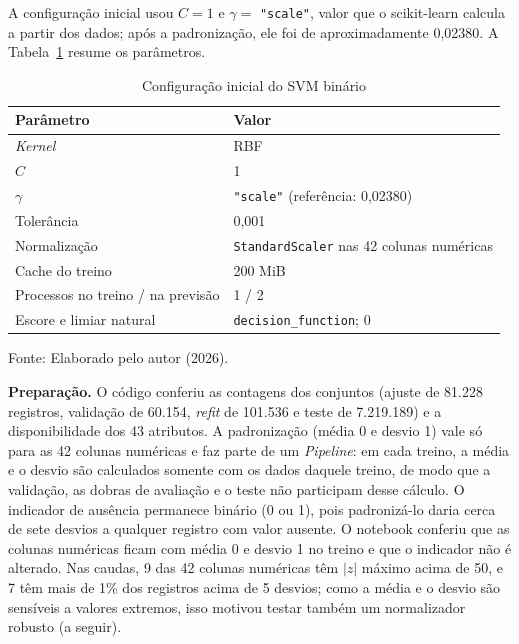 \documentclass[
    12pt,                %
    openright,           %
    oneside,             %
    a4paper,             %
    english,             %
    brazil               %
]{abntex2}
\begin{document}
A configuração inicial usou $C = 1$ e $\gamma =$ \texttt{"scale"}, valor que o scikit-learn calcula a partir dos dados; após a padronização, ele foi de aproximadamente 0,02380. A Tabela~\ref{tab:svm-config-inicial} resume os parâmetros.

\begin{table}
\centering
\caption{Configuração inicial do SVM binário}
\label{tab:svm-config-inicial}
\begin{tabular}{ll}
\hline
Parâmetro & Valor \\
\hline
\textit{Kernel} & RBF \\
$C$ & 1 \\
$\gamma$ & \texttt{"scale"} (referência: 0,02380) \\
Tolerância & 0,001 \\
Normalização & \texttt{StandardScaler} nas 42 colunas numéricas \\
Cache do treino & 200 MiB \\
Processos no treino / na previsão & 1 / 2 \\
Escore e limiar natural & \texttt{decision\_function}; 0 \\
\hline
\end{tabular}
\par\smallskip
Fonte: Elaborado pelo autor (2026).
\end{table}

\textbf{Preparação.} O código conferiu as contagens dos conjuntos (ajuste de 81.228 registros, validação de 60.154, \textit{refit} de 101.536 e teste de 7.219.189) e a disponibilidade dos 43 atributos. A padronização (média 0 e desvio 1) vale só para as 42 colunas numéricas e faz parte de um \textit{Pipeline}: em cada treino, a média e o desvio são calculados somente com os dados daquele treino, de modo que a validação, as dobras de avaliação e o teste não participam desse cálculo. O indicador de ausência permanece binário (0 ou 1), pois padronizá-lo daria cerca de sete desvios a qualquer registro com valor ausente. O notebook conferiu que as colunas numéricas ficam com média 0 e desvio 1 no treino e que o indicador não é alterado. Nas caudas, 9 das 42 colunas numéricas têm $|z|$ máximo acima de 50, e 7 têm mais de 1\% dos registros acima de 5 desvios; como a média e o desvio são sensíveis a valores extremos, isso motivou testar também um normalizador robusto (a seguir).
\end{document}

